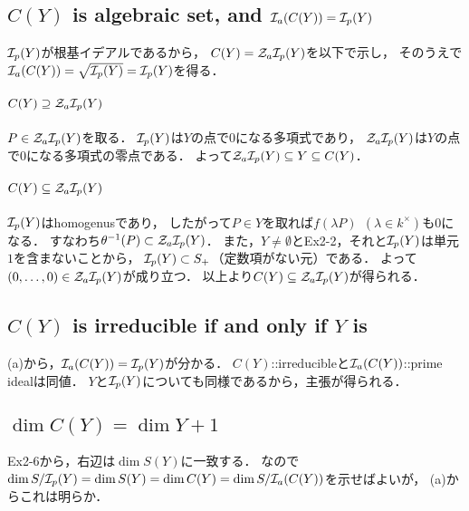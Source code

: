 \documentclass[a4paper]{jsarticle}
\begin{document}
\section{ } %
    \subsection{$C(Y)$ is algebraic set, and $\mathcal{I}_a(C(Y))=\mathcal{I}_p(Y)$}
    $\mathcal{I}_p(Y)$が根基イデアルであるから，
    $C(Y)=\mathcal{Z}_a \mathcal{I}_p(Y)$を以下で示し，
    そのうえで$\mathcal{I}_a(C(Y))=\sqrt{\mathcal{I}_p(Y)}=\mathcal{I}_p(Y)$を得る．

    \paragraph{$C(Y) \supseteq \mathcal{Z}_a \mathcal{I}_p(Y)$}
    $P \in \mathcal{Z}_a \mathcal{I}_p(Y)$を取る．
    $\mathcal{I}_p(Y)$は$Y$の点で0になる多項式であり，
    $\mathcal{Z}_a \mathcal{I}_p(Y)$は$Y$の点で0になる多項式の零点である．
    よって$\mathcal{Z}_a \mathcal{I}_p(Y) \subseteq Y \subseteq C(Y)$．

    \paragraph{$C(Y) \subseteq \mathcal{Z}_a \mathcal{I}_p(Y)$}
    $\mathcal{I}_p(Y)$はhomogenusであり，
    したがって$P \in Y$を取れば$f(\lambda P)~~(\lambda \in k^{\times})$も0になる．
    すなわち$\theta^{-1}(P) \subset \mathcal{Z}_a \mathcal{I}_p(Y)$．
    また，$Y \neq \emptyset$とEx2-2，それと$\mathcal{I}_p(Y)$は単元$1$を含まないことから，
    $\mathcal{I}_p(Y) \subset S_{+}$（定数項がない元）である．
    よって$(0,\dots,0) \in \mathcal{Z}_a \mathcal{I}_p(Y)$が成り立つ．
    以上より$C(Y) \subseteq \mathcal{Z}_a \mathcal{I}_p(Y)$が得られる．


    \subsection{$C(Y)$ is irreducible if and only if $Y$ is}
    (a)から，$\mathcal{I}_a(C(Y))=\mathcal{I}_p(Y)$が分かる．
    $C(Y)$::irreducibleと$\mathcal{I}_a(C(Y))$::prime idealは同値．
    $Y$と$\mathcal{I}_p(Y)$についても同様であるから，主張が得られる．

    \subsection{$\dim C(Y) = \dim Y + 1$}
    Ex2-6から，右辺は$\dim S(Y)$に一致する．
    なので$\dim S/\mathcal{I}_p(Y)=\dim S(Y)=\dim C(Y)=\dim S/\mathcal{I}_a(C(Y))$を示せばよいが，
    (a)からこれは明らか．

\section{ } %
\end{document}
